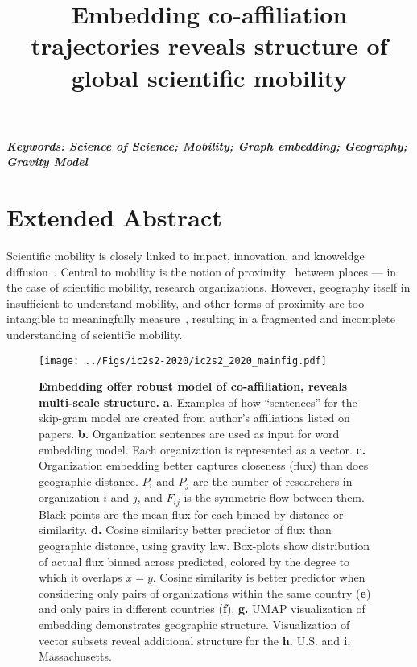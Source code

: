\documentclass[a4paper,12pt]{article}
\title{Embedding co-affiliation trajectories reveals structure of global scientific mobility}
\author[]{} %
\date{}
\begin{document}
\maketitle
\thispagestyle{fancy}

\vspace{-6em}
\begin{center}
\textbf{\textit{Keywords: Science of Science; Mobility; Graph embedding; Geography; Gravity Model}}
\newline
\end{center}

\section*{Extended Abstract}

Scientific mobility is closely linked to impact, innovation, and knoweldge diffusion~\autocite{sugimoto_scientists_2017, wagner_new_2008}.
Central to mobility is the notion of proximity~\autocite{torre_proximity_2005} between places — in the case of scientific mobility, research organizations. 
However, geography itself in insufficient to understand mobility, and other forms of proximity are too intangible to meaningfully measure~\autocite{boschma_proximity_2005}, 
resulting in a fragmented and incomplete understanding of scientific mobility. 

\begin{figure}[h!]
	\centering
	\texttt{[image: ../Figs/ic2s2-2020/ic2s2\_2020\_mainfig.pdf]}
	\caption{ 
	\textbf{Embedding offer robust model of co-affiliation, reveals multi-scale structure.}
	\textbf{a.} Examples of how ``sentences'' for the skip-gram model are created from author's affiliations listed on papers.
	\textbf{b.} Organization sentences are used as input for word embedding model. Each organization is represented as a vector.
	\textbf{c.} Organization embedding better captures closeness (flux) than does geographic distance. 
 $P_{i}$ and $P_{j}$ are the number of researchers in organization $i$ and $j$, and $F_{ij}$ is the symmetric flow between them.
	Black points are the mean flux for each binned by distance or similarity. 
	\textbf{d.} Cosine similarity better predictor of flux than geographic distance, using gravity law.
	Box-plots show distribution of actual flux binned across predicted, colored by the degree to which it overlaps $x = y$. 
	Cosine similarity is better predictor when considering only pairs of organizations within the same country (\textbf{e}) and only pairs in different countries (\textbf{f}). 
	\textbf{g.} UMAP visualization of embedding demonstrates geographic structure.
	Visualization of vector subsets reveal additional structure for the \textbf{h.} U.S. and \textbf{i.} Massachusetts. 
	 }
	\label{fig:image}
\end{figure}
\end{document}
